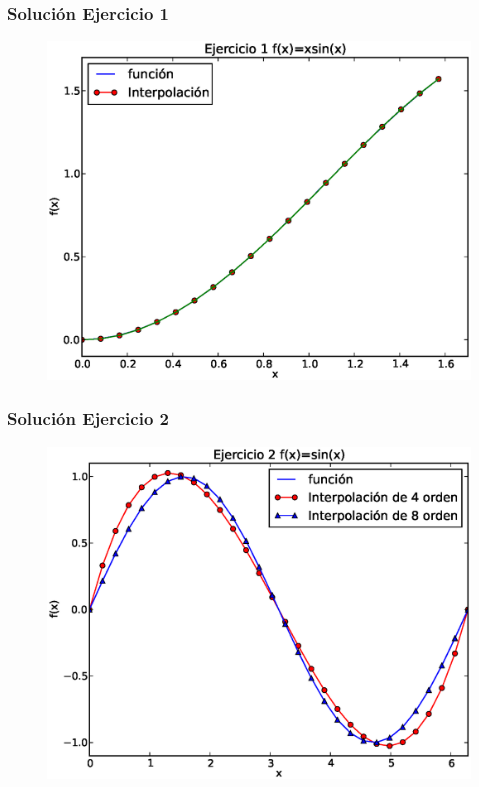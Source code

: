 \begin{frame}
\frametitle{Solución Ejercicio 1}
\begin{figure}
	\centering
	\includegraphics[scale=0.45]{Imagenes/ejercicioTema21_1.eps} 
\end{figure}
\end{frame}
\begin{frame}
\frametitle{Solución Ejercicio 2}
\begin{figure}
	\centering
	\includegraphics[scale=0.45]{Imagenes/ejercicioTema21_2.eps} 
\end{figure}
\end{frame}
